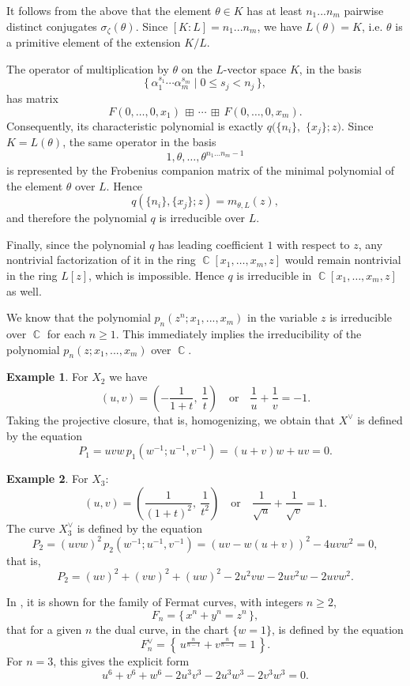 \documentclass[14pt, dvipsnames]{extarticle}
\makeatletter
\theoremstyle{plain}
\theoremstyle{definition}
\newtheorem{example}{\bf Example}
\theoremstyle{remark}
\renewenvironment{proof}[1][\proofname]{
  \par\pushQED{\qed}\normalfont
  \topsep6\p@\@plus6\p@\relax
  \trivlist\item[\hskip\labelsep\bfseries\itshape #1\@addpunct{.}]
}{\popQED\endtrivlist\@endpefalse}
\DeclareMathOperator{\Cc}{\mathbb{C}}
\makeatother
\begin{document}
\begin{proof}
It follows from the above that the element $\theta\in K$ has at least $n_1...n_m$ pairwise distinct conjugates $\sigma_\zeta(\theta)$. Since $[K:L] = n_1...n_m$, we have $L(\theta) = K$, i.e. $\theta$ is a primitive element of the extension $K/L$.  

The operator of multiplication by $\theta$ on the $L$-vector space $K$, in the basis
$$\{\,\alpha_1^{s_1}\cdots \alpha_m^{s_m}\mid 0\le s_j<n_j\,\},$$
has matrix
$$F(0,\dots,0,x_1)\,\boxplus\,\cdots\,\boxplus\,F(0,\dots,0,x_m).$$
Consequently, its characteristic polynomial is exactly $q(\{n_i\},$ $\{x_j\};z)$. Since $K=L(\theta)$, the same operator in the basis
$$1,\theta,\dots,\theta^{n_1...n_m-1}$$
is represented by the Frobenius companion matrix of the minimal polynomial of the element $\theta$ over $L$. Hence
$$q(\{n_i\},\{x_j\};z)=m_{\theta,L}(z),$$
and therefore the polynomial $q$ is irreducible over $L$.  

Finally, since the polynomial $q$ has leading coefficient $1$ with respect to $z$, any nontrivial factorization of it in the ring $\Cc[x_1,\dots,x_m,z]$ would remain nontrivial in the ring $L[z]$, which is impossible. Hence $q$ is irreducible in $\Cc[x_1,\dots,x_m,z]$ as well.

We know that the polynomial $p_n(z^n; x_1, ..., x_m)$ in the variable $z$ is irreducible over $\Cc$ for each $n\geq1$. This immediately implies the irreducibility of the polynomial $p_n(z; x_1, ..., x_m)$ over $\Cc$.

\end{proof}





\begin{example}\label{X_2}
For $X_2$ we have
$$(u,v)=\left(-\frac{1}{1+t},\ \frac{1}{t}\right)\quad\text{or}\quad \frac{1}{u}+\frac{1}{v}=-1.$$
Taking the projective closure, that is, homogenizing, we obtain that $X^\vee$ is defined by the equation
$$P_1=uvw\,p_1(w^{-1};u^{-1},v^{-1})=(u+v)w+uv=0.$$
\end{example}

\begin{example}
For $X_3$:
$$(u,v)=\left(\frac{1}{(1+t)^2},\ \frac{1}{t^2}\right)\quad\text{or}\quad \frac{1}{\sqrt{u}}+\frac{1}{\sqrt{v}}=1.$$
The curve $X_3^\vee$ is defined by the equation
$$P_2=(uvw)^2\,p_2(w^{-1};u^{-1},v^{-1})=(uv-w(u+v))^2-4uvw^2=0,$$
that is,
$$P_2=(uv)^2+(vw)^2+(uw)^2-2u^2vw-2uv^2w-2uvw^2.$$
\end{example}

In \cite[Chapter 1, Example 2.3]{Gelfand}, it is shown for the family of Fermat curves, with integers $n\ge 2$,
\begin{equation}\label{Fermat_curve}
F_n=\{\,x^n+y^n=z^n\,\},
\end{equation}
that for a given $n$ the dual curve, in the chart $\{w=1\}$, is defined by the equation
$$F_n^\vee=\left\{\,u^{\frac{n}{n-1}}+v^{\frac{n}{n-1}}=1\,\right\}.$$
For $n=3$, this gives the explicit form
$$u^6+v^6+w^6-2u^3v^3-2u^3w^3-2v^3w^3=0.$$
\end{document}
